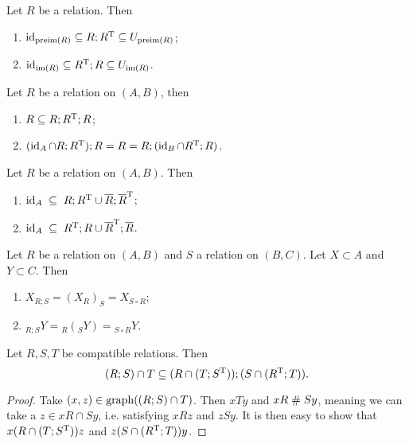 \begin{lemma} \label{kernelInclusions}
Let $R$ be a relation. Then
\begin{enumerate}
\item $\operatorname{id}_{\operatorname{preim}(R)} \subseteq R;R^{\mathrm{T}} \subseteq U_{\operatorname{preim}(R)}$;
\item $\operatorname{id}_{\operatorname{im}(R)} \subseteq R^{\mathrm{T}};R \subseteq U_{\operatorname{im}(R)}$.
\end{enumerate}
\end{lemma}
\begin{corollary}
Let $R$ be a relation on $(A,B)$, then
\begin{enumerate}
\item $R \subseteq R;R^{\mathrm{T}};R$;
\item $(\operatorname{id}_A \cap R;R^{\mathrm{T}});R = R = R;(\operatorname{id}_{B}\cap R^{\mathrm{T}};R)$.
\end{enumerate}
\end{corollary}
\begin{corollary}
Let $R$ be a relation on $(A,B)$. Then
\begin{enumerate}
\item $\operatorname{id}_A \;\subseteq\; R;R^{\mathrm{T}} \cup \overline{R};\overline{R}^{\mathrm{T}}$;
\item $\operatorname{id}_A \;\subseteq\; R^{\mathrm{T}};R \cup \overline{R}^{\mathrm{T}};\overline{R}$.
\end{enumerate}
\end{corollary}

\begin{lemma}
Let $R$ be a relation on $(A, B)$ and $S$ a relation on $(B, C)$. Let $X\subset A$ and $Y\subset C$. Then
\begin{enumerate}
\item $X_{R;S} = (X_R)_S = X_{S\circ R}$;
\item $_{R;S}Y = {_R({_SY})} = {_{S\circ R}Y}$.
\end{enumerate}
\end{lemma}

\begin{proposition} \label{DedekindFormula}
Let $R,S,T$ be compatible relations. Then
\[ (R;S)\cap T \subseteq (R\cap (T; S^{\mathrm{T}}));(S\cap (R^{\mathrm{T}};T)). \]
\end{proposition}
\begin{proof}
Take $(x,z)\in \operatorname{graph}((R;S)\cap T)$. Then $xTy$ and $xR \mathrel{\#} Sy$, meaning we can take a $z\in xR\cap Sy$, i.e. satisfying $xRz$ and $zSy$. It is then easy to show that $x(R\cap (T; S^{\mathrm{T}}))z$ and $z(S\cap (R^{\mathrm{T}};T))y$.
\end{proof}

